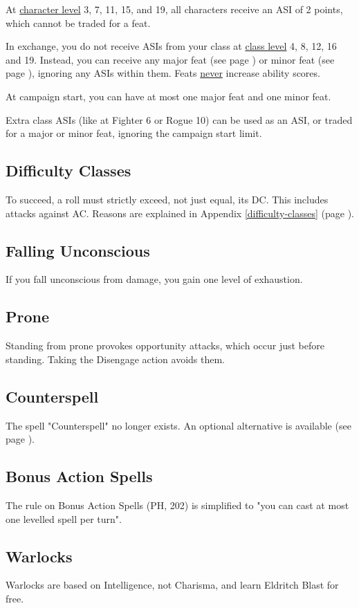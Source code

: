 \documentclass[letterpaper,twocolumn,openany,nodeprecatedcode,bg=print]{dndbook}
\newcommand{\pg}[1]{page \pageref{#1}}
\newcommand{\see}[1]{(see \pg{#1})}
\begin{document}
At \underline{character level} 3, 7, 11, 15, and 19, all characters receive an ASI of 2 points, which cannot be traded for a feat.

In exchange, you do not receive ASIs from your class at \underline{class level} 4, 8, 12, 16 and 19. Instead, you can receive any major feat \see{major-feats-table} or minor feat \see{minor-feats-table}, ignoring any ASIs within them. Feats \underline{never} increase ability scores.

At campaign start, you can have at most one major feat and one minor feat.

Extra class ASIs (like at Fighter 6 or Rogue 10) can be used as an ASI, or traded for a major or minor feat, ignoring the campaign start limit.

\subsection{Difficulty Classes}
To succeed, a roll must strictly exceed, not just equal, its DC. 
This includes attacks against AC. 
Reasons are explained in Appendix \ref{difficulty-classes} (\pg{difficulty-classes}).

\subsection{Falling Unconscious}
If you fall unconscious from damage, you gain one level of exhaustion.

\subsection{Prone}
Standing from prone provokes opportunity attacks, which occur just before standing. 
Taking the Disengage action avoids them.

\subsection{Counterspell}
The spell "Counterspell" no longer exists. 
An optional alternative is available \see{counterspell}.

\subsection{Bonus Action Spells}
The rule on Bonus Action Spells (PH, 202) is simplified to
"you can cast at most one levelled spell per turn".

\subsection{Warlocks}
Warlocks are based on Intelligence, not Charisma, and learn Eldritch Blast for free.
\end{document}
